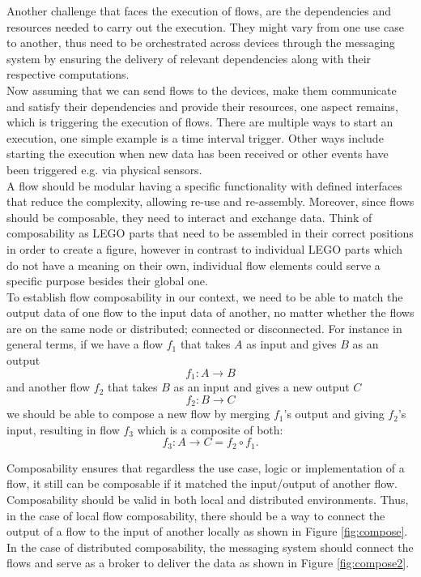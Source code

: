 \noindent Another challenge that faces the execution of  flows, are the dependencies and resources needed to carry out the execution.
 They might vary from one use case to another, thus need to be orchestrated across devices through the messaging system by  ensuring the delivery of relevant dependencies along with their respective computations.\\
 
\noindent Now assuming that we can send flows to the devices, make them communicate and satisfy their dependencies and provide their resources, one aspect remains, which is triggering the execution of flows. There are multiple ways to start an execution, one simple example is a time interval trigger. Other ways include starting the execution when new data has been received or other events have been triggered e.g. via physical sensors.\\


\noindent A flow should be modular having a specific functionality with defined interfaces that reduce the complexity, allowing re-use and re-assembly. Moreover, since flows should be composable, they need to interact and exchange data. Think of composability as LEGO parts that need to be assembled in their correct positions in order to create a figure, however in contrast to individual LEGO parts which do not have a meaning on their own, individual flow elements could serve a specific purpose besides their global one. \\
 
\noindent  To establish flow composability in our context, we need to be able to match the output data of one flow to the input data of another, no matter whether the flows are on the same node or distributed; connected or disconnected. For instance in general terms, if we have a flow \(f_1\) that takes \(A\) as input and gives \(B\) as an output
\[ f_1 : A  \to B  \]
and another flow \(f_2\) that takes \(B\) as an input and gives a new output \(C\)
\[ f_2 : B  \to C  \]
we should be able to compose a new flow by merging  \(f_1\)'s output and giving \(f_2\)'s input, resulting in flow \(f_3\) which is a composite of both:
\[f_3: A \to C = f_2 \circ f_1 .\]

 \noindent Composability ensures that regardless the use case, logic or implementation of a flow, it still can be composable if it matched the input/output of another flow. Composability should be valid in both local and distributed environments. Thus, in the case of local flow composability, there should be a way to connect the output of a flow to the input of another locally as shown in Figure \ref{fig:compose}. In the case of distributed composability, the messaging system should connect the flows and serve as a broker to deliver the data as shown in Figure \ref{fig:compose2}. 

